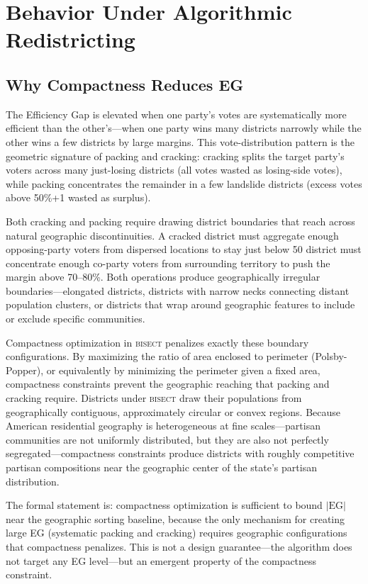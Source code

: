 \section{Behavior Under Algorithmic Redistricting}
\label{sec:behavior}

\subsection{Why Compactness Reduces EG}

The Efficiency Gap is elevated when one party's votes are systematically more
efficient than the other's---when one party wins many districts narrowly while
the other wins a few districts by large margins. This vote-distribution pattern
is the geometric signature of packing and cracking: cracking splits the target
party's voters across many just-losing districts (all votes wasted as losing-side
votes), while packing concentrates the remainder in a few landslide districts
(excess votes above 50\%+1 wasted as surplus).

Both cracking and packing require drawing district boundaries that reach across
natural geographic discontinuities. A cracked district must aggregate enough
opposing-party voters from dispersed locations to stay just below 50%
district must concentrate enough co-party voters from surrounding territory to
push the margin above 70--80\%. Both operations produce geographically irregular
boundaries---elongated districts, districts with narrow necks connecting distant
population clusters, or districts that wrap around geographic features to include
or exclude specific communities.

Compactness optimization in \textsc{bisect} penalizes exactly these boundary
configurations. By maximizing the ratio of area enclosed to perimeter (Polsby-Popper),
or equivalently by minimizing the perimeter given a fixed area, compactness
constraints prevent the geographic reaching that packing and cracking require.
Districts under \textsc{bisect} draw their populations from geographically
contiguous, approximately circular or convex regions. Because American residential
geography is heterogeneous at fine scales---partisan communities are not uniformly
distributed, but they are also not perfectly segregated---compactness constraints
produce districts with roughly competitive partisan compositions near the geographic
center of the state's partisan distribution.

The formal statement is: compactness optimization is sufficient to bound $|\text{EG}|$
near the geographic sorting baseline, because the only mechanism for creating large
EG (systematic packing and cracking) requires geographic configurations that
compactness penalizes. This is not a design guarantee---the algorithm does not
target any EG level---but an emergent property of the compactness constraint.

